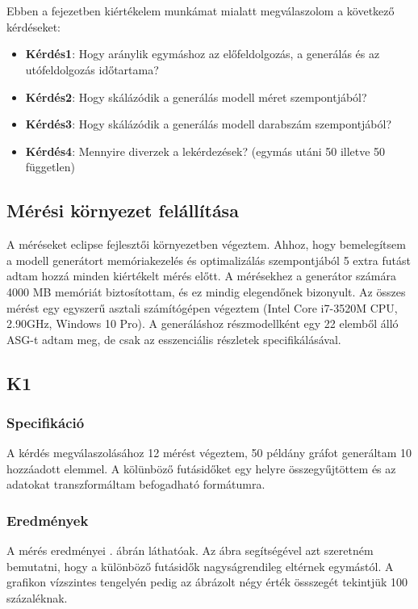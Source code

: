 \chapter{\evaluation}

Ebben a fejezetben kiértékelem munkámat mialatt megválaszolom a következő kérdéseket:

\begin{itemize}
	\item \textbf{Kérdés1}: Hogy aránylik egymáshoz az előfeldolgozás, a generálás és az utófeldolgozás időtartama?
	\item \textbf{Kérdés2}: Hogy skálázódik a generálás modell méret szempontjából?
	\item \textbf{Kérdés3}: Hogy skálázódik a generálás modell darabszám szempontjából?
	\item \textbf{Kérdés4}: Mennyire diverzek a lekérdezések? (egymás utáni 50 illetve 50 független) 
\end{itemize}

\section{Mérési környezet felállítása}


A méréseket eclipse fejlesztői környezetben végeztem. Ahhoz, hogy bemelegítsem a modell generátort memóriakezelés és optimalizálás szempontjából 5 extra futást adtam hozzá minden kiértékelt mérés előtt. A mérésekhez a generátor számára 4000 MB memóriát biztosítottam, és ez mindig elegendőnek bizonyult. Az összes mérést egy egyszerű asztali számítógépen végeztem (Intel Core i7-3520M CPU, 2.90GHz, Windows 10 Pro). A generáláshoz részmodellként egy 22 elemből álló ASG-t adtam meg, de csak az esszenciális részletek specifikálásával.  

\section{K1}
\subsection{Specifikáció}
A kérdés megválaszolásához 12 mérést végeztem, 50 példány gráfot generáltam 10 hozzáadott elemmel. A kölünböző futásidőket egy helyre összegyűjtöttem és az adatokat transzformáltam befogadható formátumra.
\subsection{Eredmények}
A mérés eredményei  . ábrán láthatóak. Az ábra segítségével azt szeretném bemutatni, hogy a különböző futásidők nagyságrendileg eltérnek egymástól. A grafikon vízszintes tengelyén pedig az ábrázolt négy érték össszegét tekintjük 100 százaléknak.

